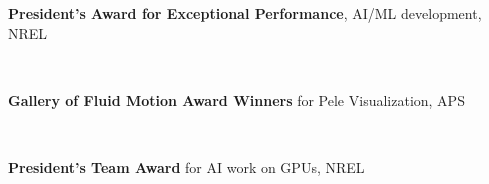 \documentclass[11pt,letterpaper]{article}
\begin{document}
\begin{minipage}[t]{0.82\textwidth}%
  \textbf{President’s Award for Exceptional Performance}, AI/ML development, NREL%
\end{minipage}\hfill%
\begin{minipage}[t]{0.15\textwidth}%
\end{minipage}\\[0ex]%
\begin{minipage}[t]{0.82\textwidth}%
  \textbf{Gallery of Fluid Motion Award Winners} for Pele Visualization, APS%
\end{minipage}\hfill%
\begin{minipage}[t]{0.15\textwidth}%
\end{minipage}\\[0ex]%
\begin{minipage}[t]{0.82\textwidth}%
  \textbf{President’s Team Award} for AI work on GPUs, NREL%
\end{minipage}\hfill%
\begin{minipage}[t]{0.15\textwidth}%
\end{minipage}\\[2ex]%
\end{document}

